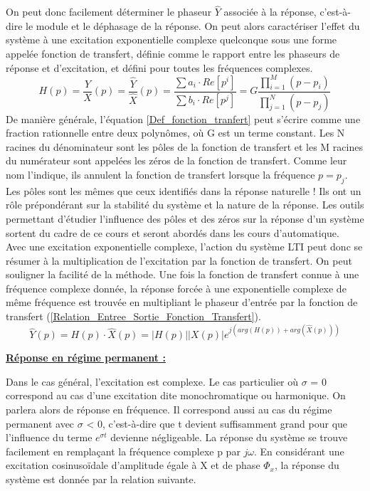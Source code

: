 	On peut donc facilement déterminer le phaseur $\hat{Y}$ associée à la réponse, c'est-à-dire le module et le déphasage de la réponse. 
	On peut alors caractériser l'effet du système à une excitation exponentielle complexe quelconque sous une forme appelée fonction de transfert, définie comme le rapport entre les phaseurs de réponse et d'excitation, et défini pour toutes les fréquences complexes. 
	\begin{equation}\label{Def_fonction_tranfert}
	H(p) = \frac{Y}{X} (p) = \frac{\hat Y}{\hat X} (p)= \frac{\sum a_{i} \cdot Re[p^{i}]}{\sum b_{i} \cdot Re[p^{j}]}=G\frac{\prod_{i=1}^{M} (p-p_{i})}{\prod_{j=1}^{N} (p-p_{j})}
	\end{equation}
	De manière générale, l'équation \ref{Def_fonction_tranfert} peut s'écrire comme une fraction rationnelle entre deux polynômes, où G est un terme constant. Les N racines du dénominateur sont les pôles de la fonction de transfert et les M racines du numérateur sont appelées les zéros de la fonction de transfert. Comme leur nom l'indique, ils annulent la fonction de transfert lorsque la fréquence $p=p_{j}$. Les pôles sont les mêmes que ceux identifiés dans la réponse naturelle ! Ils ont un rôle prépondérant sur la stabilité du système et la nature de la réponse. Les outils permettant d'étudier l'influence des pôles et des zéros sur la réponse d'un système sortent du cadre de ce cours et seront abordés dans les cours d'automatique.\\
	
	Avec une excitation exponentielle complexe, l'action du système LTI peut donc se résumer à la multiplication de l'excitation par la fonction de transfert.
	On peut souligner la facilité de la méthode. Une fois la fonction de transfert connue à une fréquence complexe donnée, la réponse forcée à une exponentielle complexe de même fréquence est trouvée en multipliant le phaseur d'entrée par la fonction de transfert (\ref{Relation_Entree_Sortie_Fonction_Transfert}).
	\begin{equation}\label{Relation_Entree_Sortie_Fonction_Transfert}
	\hat{Y}(p) = H(p)\cdot \hat{X}(p)=|H(p)||X(p)|e^{j(arg(H(p))+arg(\hat{X}(p)))}	
	\end{equation}
	
	\vspace{1\baselineskip}
	
	
	\textbf{\underline{Réponse en régime permanent :} }
	
	Dans le cas général, l'excitation est complexe. Le cas particulier où $\sigma$ = 0 correspond au cas d'une excitation dite monochromatique ou harmonique. On parlera alors de réponse en fréquence. Il correspond aussi au cas du régime permanent avec $\sigma$ < 0, c'est-à-dire que t devient suffisamment grand pour que l'influence du terme $e^{\sigma t}$ devienne négligeable. 
	La réponse du système se trouve facilement en remplaçant la fréquence complexe p par $j\omega$. En considérant une excitation cosinusoïdale d'amplitude égale à X et de phase $\Phi_{x}$, la réponse du système est donnée par la relation suivante.
	
